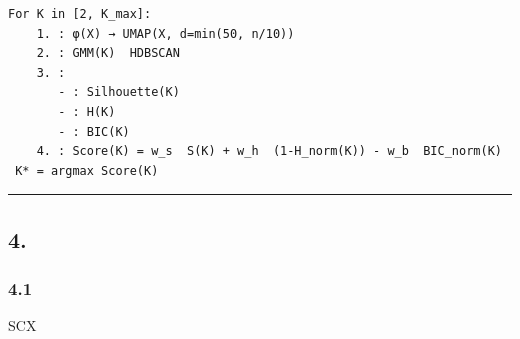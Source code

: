 \documentclass[
  12pt,
]{article}
\begin{document}
\begin{verbatim}
For K in [2, K_max]:
    1. : φ(X) → UMAP(X, d=min(50, n/10))
    2. : GMM(K)  HDBSCAN
    3. :
       - : Silhouette(K)
       - : H(K)
       - : BIC(K)
    4. : Score(K) = w_s  S(K) + w_h  (1-H_norm(K)) - w_b  BIC_norm(K)
 K* = argmax Score(K)
\end{verbatim}

\begin{center}\rule{0.5\linewidth}{0.5pt}\end{center}

\subsection{4.
}\label{ux5b50ux6a21ux5757ux6570ux636eux6d41ux4e0eux534fux8c03}

\subsubsection{4.1 }\label{ux6574ux4f53ux67b6ux6784}

SCX 
\end{document}
